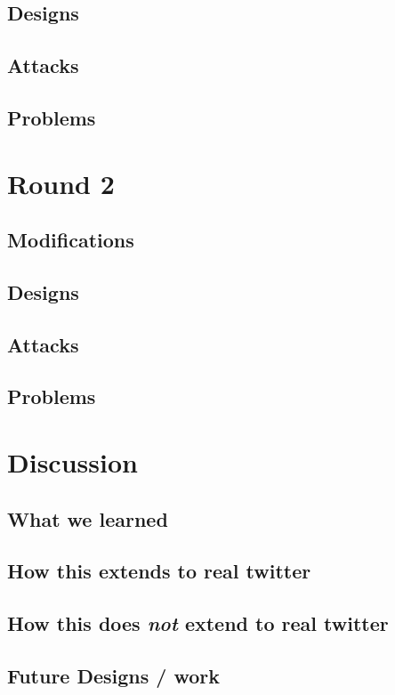 \documentclass[11pt, oneside]{article} %
\numberwithin{equation}{section} %
\numberwithin{figure}{section} %
\numberwithin{table}{section} %
\begin{document}
	\subsection{Designs}
	\subsection{Attacks}
	\subsection{Problems}

\section{Round 2}
	\subsection{Modifications}
	\subsection{Designs}
	\subsection{Attacks}
	\subsection{Problems}

\section{Discussion}

	\subsection{What we learned}
	\subsection{How this extends to real twitter}
	\subsection{How this does \textit{not} extend to real twitter}
	\subsection{Future Designs / work}
\end{document}
